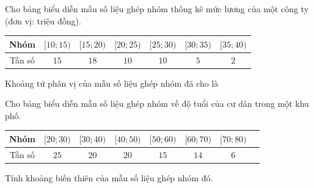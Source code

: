 \begin{ex}%
	Cho bảng biểu diễn mẫu số liệu ghép nhóm thống kê mức lương của một công ty (đơn vị: triệu đồng).
\begin{center}\begin{tabular}{|c|c|c|c|c|c|c|}
		\hline Nhóm & $[10 ; 15)$ & $[15 ; 20)$ & $[20 ; 25)$ & $[25 ; 30)$ & $[30 ; 35)$ & $[35 ; 40)$  \\
		\hline Tần số & $15$ & $18$ & $10$ &$10$ &$5$ &$2$\\
		\hline
\end{tabular}\end{center}
Khoảng tứ phân vị của mẫu số liệu ghép nhóm đã cho là 
\end{ex}
\begin{ex}%
Cho bảng biểu diễn mẫu số liệu ghép nhóm về độ tuổi của cư dân trong một khu phố.
	\begin{center}	\begin{tabular}{|c|c|c|c|c|c|c|c|}
			\hline Nhóm & $[20 ; 30)$& $[30 ; 40)$ & $[40 ; 50)$ & $[50 ; 60)$& $[60 ; 70)$ & $[70 ; 80)$ \\ 
			\hline Tần số & $25$ &$20$&$20$ &$15$&$14$&$6$ \\
			\hline
	\end{tabular}\end{center}
Tính khoảng biến thiên của mẫu số liệu ghép nhóm đó.
\end{ex}
